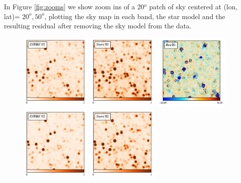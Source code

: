 \documentclass{aa}
\begin{document}
In Figure \ref{fig:zooms} we show zoom ins of a 20$^o$ patch of sky centered at (lon, lat)= $20^o, 50^o$, plotting the sky map in each band, the star model and the resulting residual after removing the sky model from the data.

\begin{figure}
  \centering
  \includegraphics[width=0.31\textwidth]{figs/zoom/bandmap_01.pdf}
  \includegraphics[width=0.31\textwidth]{figs/zoom/starmap_01.pdf}
  \includegraphics[width=0.33\textwidth]{figs/zoom/resmap_01.pdf}\\
    \includegraphics[width=0.31\textwidth]{figs/zoom/bandmap_02.pdf}
  \includegraphics[width=0.31\textwidth]{figs/zoom/starmap_02.pdf}

\end{figure}
\end{document}
